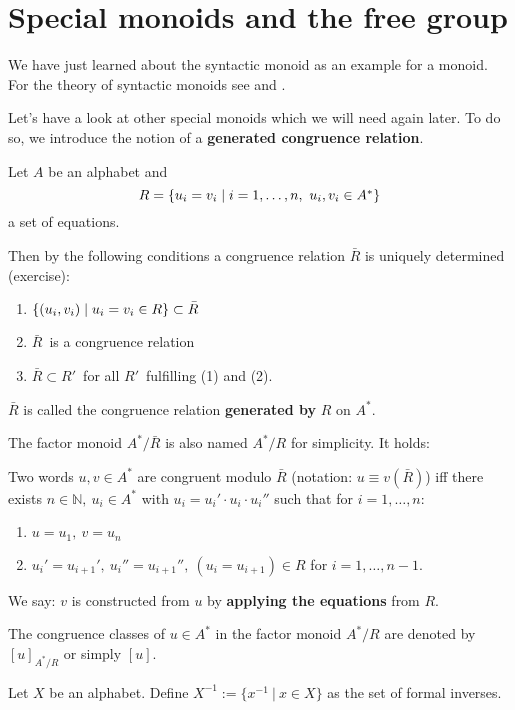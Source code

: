\section{Special monoids and the free group}

We have just learned about the syntactic monoid as an example for a monoid. For
the theory of syntactic monoids see \cite{Salomaa} and \cite{Perrot}.

Let's have a look at other special monoids which we will need again later. To do
so, we introduce the notion of a {\bf generated congruence relation}.

Let $A$ be an alphabet and
\[ R = \mbox{$\{u_i = v_i \mid i = 1, \ldots, n,\ u_i, v_i \in A^*\}$} \] 
a set of equations.

Then by the following conditions a congruence relation $\bar{R}$ is uniquely
determined (exercise):
\begin{enumerate}
  \item $\mbox{$\{(u_i, v_i) \mid u_i = v_i \in R\}$} \subset \bar{R}$
  \item $\bar{R}$\ is a congruence relation
  \item $\bar{R} \subset R'$\ for all $R'$\ fulfilling (1) and (2).
\end{enumerate}


$\bar{R}$ is called the congruence relation {\bf generated by} $R$ on $A^*$.

The factor monoid $A^*/\bar{R}$ is also named $A^*/R$ for simplicity. It holds: 

Two words $u, v \in A^*$ are congruent modulo $\bar{R}$ (notation: $u
\equiv v (\bar{R})$) iff there exists $n \in \mathbb{N},\ u_i \in A^*$ with $u_i
= u_i' \cdot u_i \cdot u_i''$ such that for $i = 1, \ldots, n$:
\begin{enumerate}
  \item $u = u_1,\ v = u_n$
  \item $u_i' = u_{i+1}',\ u_{i}'' = u_{i+1}'',\ (u_{i} = u_{i+1}) \in R$ 
  for $i = 1, \ldots, n-1$.
\end{enumerate}

We say: $v$ is constructed from $u$ by {\bf applying the equations} from $R$.

The congruence classes of $u \in A^*$ in the factor monoid $A^*/R$ are denoted
by $[u]_{A^*/R}$ or simply $[u]$.

\begin{definition}
Let $X$ be an alphabet. Define $X^{-1} := \{ x^{-1}\ |\ x \in X \}$ as the set
of formal inverses.
\end{definition}

